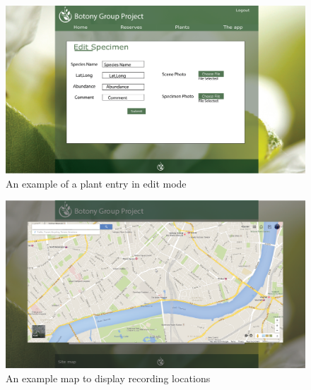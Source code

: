 \begin{landscape}
            \begin{figure}
                \centering
                \includegraphics[scale=0.4]{uiwebimages/editspecimen.png}
                \caption{An example of a plant entry in edit mode}
                \label{fig:editWeb}
           \end{figure}

            \begin{figure}
                \centering
                \includegraphics[scale=0.4]{uiDesign/uiwebimages/map.png}
                \caption{An example map to display recording locations}
                \label{fig:mapWeb}
            \end{figure}
        \end{landscape}